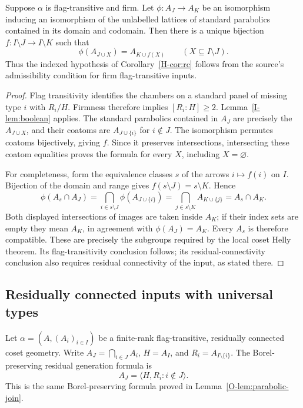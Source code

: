\begin{corollary}\label{I-cor:firm}
Suppose $\alpha$ is flag-transitive and firm. Let
$\phi:A_J\longrightarrow A_K$ be an isomorphism inducing an isomorphism
of the unlabelled lattices of standard parabolics contained in its domain
and codomain. Then there is a unique bijection
$f:I\setminus J\longrightarrow I\setminus K$ such that
\[
 \phi(A_{J\cup X})=A_{K\cup f(X)}
 \qquad(X\subseteq I\setminus J).
\]
Thus the indexed hypothesis of Corollary~\ref{H-cor:rc} follows from the source's
admissibility condition for firm flag-transitive inputs.
\end{corollary}
\begin{proof}
Flag transitivity identifies the chambers on a standard panel of missing
type $i$ with $R_i/H$. Firmness therefore implies $[R_i:H]\geq2$.
Lemma~\ref{I-lem:boolean} applies. The standard parabolics contained in
$A_J$ are precisely the $A_{J\cup X}$, and their coatoms are
$A_{J\cup\{i\}}$ for $i\notin J$. The isomorphism permutes coatoms
bijectively, giving $f$. Since it preserves intersections, intersecting
these coatom equalities proves the formula for every $X$, including
$X=\varnothing$.

For completeness, form the equivalence classes $s$ of the arrows
$i\mapsto f(i)$ on $I$. Bijection of the domain and range gives
$f(s\setminus J)=s\setminus K$. Hence
\[
 \phi(A_s\cap A_J)
 =\bigcap_{i\in s\setminus J}\phi(A_{J\cup\{i\}})
 =\bigcap_{j\in s\setminus K}A_{K\cup\{j\}}
 =A_s\cap A_K.
\]
Both displayed intersections of images are taken inside $A_K$; if
their index sets are empty they mean $A_K$, in agreement with
$\phi(A_J)=A_K$. Every $A_s$ is therefore compatible. These are precisely the
subgroups required by the local coset Helly theorem. Its flag-transitivity
conclusion follows; its residual-connectivity conclusion also requires
residual connectivity of the input, as stated there.
\end{proof}


\subsection{Residually connected inputs with universal types}
Let $\alpha=(A,(A_i)_{i\in I})$ be a finite-rank flag-transitive,
residually connected coset geometry. Write $A_J=\bigcap_{i\in J}A_i$,
$H=A_I$, and $R_i=A_{I\setminus\{i\}}$.
The Borel-preserving residual generation formula is
\begin{equation}\label{R-eq:gen}
 A_J=\langle H,R_i:i\notin J\rangle.
\end{equation}
This is the same Borel-preserving formula proved in Lemma~\ref{O-lem:parabolic-join}.

